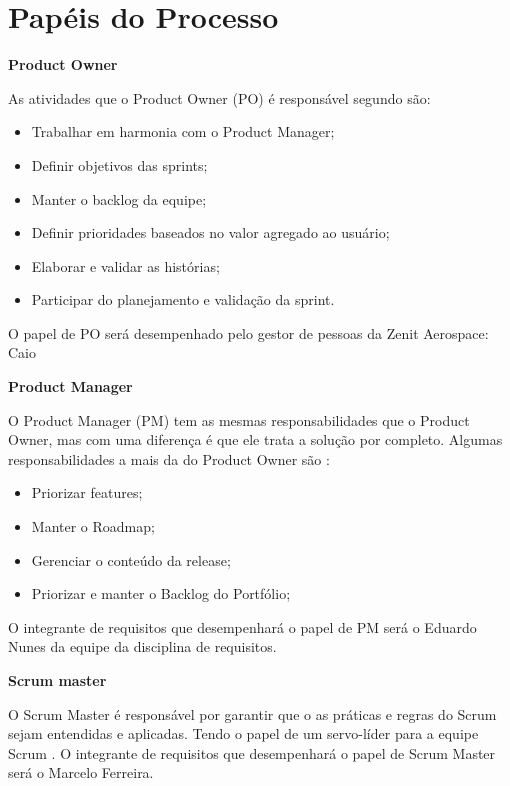 \section{Papéis do Processo}
\begin{description}
\item \textbf{Product Owner}

As atividades que o Product Owner (PO) é responsável segundo \cite{leffingwell2011} são:
\begin{itemize}
    \item Trabalhar em harmonia com o Product Manager;
    \item Definir objetivos das sprints;
    \item Manter o backlog da equipe;
    \item Definir prioridades baseados no valor agregado ao usuário;
    \item Elaborar e validar as histórias;
    \item Participar do planejamento e validação da sprint.
\end{itemize}
O papel de PO será desempenhado pelo gestor de pessoas da Zenit Aerospace: Caio

\item \textbf{Product Manager}

O Product Manager (PM) tem as mesmas responsabilidades que o Product Owner, mas com uma diferença é que ele trata a solução por completo. Algumas responsabilidades a mais da do Product Owner são \cite{leffingwell2011}:
\begin{itemize}
    \item Priorizar features;
    \item Manter o Roadmap;
    \item Gerenciar o conteúdo da release;
    \item Priorizar e manter o Backlog do Portfólio;
\end{itemize}

O integrante de requisitos que desempenhará o papel de PM será o Eduardo Nunes da equipe da disciplina de requisitos.

\item \textbf{Scrum master}

O Scrum Master é responsável por garantir que o as práticas e regras do Scrum sejam entendidas e aplicadas. Tendo o papel de um servo-líder para a equipe Scrum \cite{agileManifest}. O integrante de requisitos que desempenhará o papel de Scrum Master será o Marcelo Ferreira.


\end{description}
